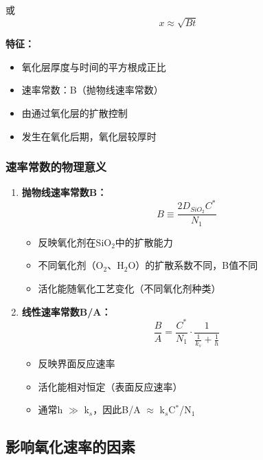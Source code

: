 \documentclass[UTF8,12pt,a4paper]{ctexart}
\begin{document}
或
\begin{equation}
x \approx \sqrt{Bt}
\end{equation}

\textbf{特征：}
\begin{itemize}
    \item 氧化层厚度与时间的平方根成正比
    \item 速率常数：B（抛物线速率常数）
    \item 由通过氧化层的扩散控制
    \item 发生在氧化后期，氧化层较厚时
\end{itemize}

\subsubsection{速率常数的物理意义}

\begin{enumerate}
    \item \textbf{抛物线速率常数B：}
    \begin{equation}
    B \equiv \frac{2D_{SiO_2}C^*}{N_1}
    \end{equation}
    \begin{itemize}
        \item 反映氧化剂在SiO$_2$中的扩散能力
        \item 不同氧化剂（O$_2$、H$_2$O）的扩散系数不同，B值不同
        \item 活化能随氧化工艺变化（不同氧化剂种类）
    \end{itemize}
    
    \item \textbf{线性速率常数B/A：}
    \begin{equation}
    \frac{B}{A} = \frac{C^*}{N_1} \cdot \frac{1}{\frac{1}{k_s} + \frac{1}{h}}
    \end{equation}
    \begin{itemize}
        \item 反映界面反应速率
        \item 活化能相对恒定（表面反应速率）
        \item 通常h $\gg$ k$_s$，因此B/A $\approx$ k$_s$C$^*$/N$_1$
    \end{itemize}
\end{enumerate}

\subsection{影响氧化速率的因素}
\end{document}

